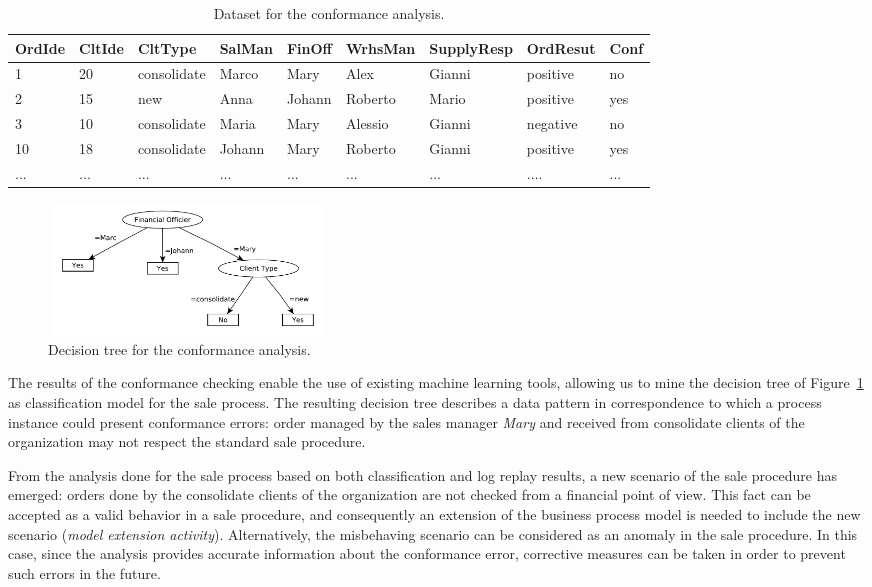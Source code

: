 \documentclass{llncs}
\begin{document}
\begin{table}[!h]
\scriptsize{
\centering
\begin{tabular}{|p{1cm}|p{1cm}|p{}|p{}|p{}|p{}|p{}|p{}|p{}|}
\hline OrdIde & CltIde & CltType & SalMan & FinOff & WrhsMan & SupplyResp & OrdResut & Conf\\
\hline
1 & 20 & consolidate & Marco & Mary & Alex & Gianni & positive & no\\
\hline
2 & 15 & new & Anna & Johann & Roberto & Mario & positive & yes\\
\hline
3 & 10 &consolidate & Maria & Mary & Alessio & Gianni & negative & no\\
\hline
10 & 18 & consolidate & Johann & Mary & Roberto & Gianni & positive & yes \\
\hline
... & ... & ... & ... & ... & ... & ... & .... & ...  \\
\hline
\end{tabular}
}
\caption{Dataset for the conformance analysis.}
\label{tab:SaleData}
\end{table}
\normalsize


\begin{figure}[h]
\centering
\includegraphics[width=210pt,height=100pt]
{./items/Sales_tree.pdf}
\caption{Decision tree for the conformance analysis.}
\label{salesDecTree}
\end{figure}

The results of the conformance checking enable the use of 
existing machine learning  tools, allowing us to mine the decision tree of Figure~\ref{salesDecTree} as classification model for the sale process.
The resulting decision tree describes a data pattern in correspondence to which a process instance could present conformance errors: order managed by the sales manager \emph{Mary} and received from consolidate clients of the organization may not respect the standard sale procedure. 

From the analysis done for the sale process based on both
classification and log replay results, a new scenario of the sale
procedure has emerged: orders done by the consolidate clients of the
organization are not checked from a financial point of view. This fact
can be accepted as a valid  behavior in a sale procedure, and consequently
an extension of the business process model is needed to include the
new scenario (\emph{model extension activity}). Alternatively, the
misbehaving scenario can be considered as an anomaly in the sale
procedure. In this case, since the analysis provides accurate
information about the conformance error, corrective measures can be
taken in order to prevent such errors in the future.
\end{document}
